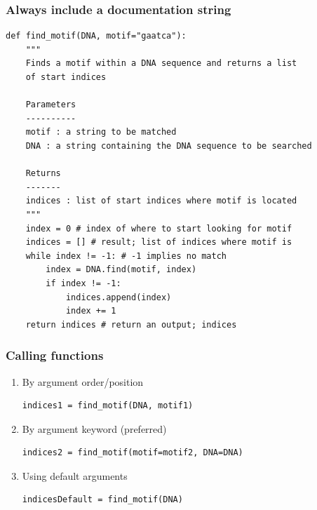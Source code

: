 \documentclass[xcolor=table]{beamer}
\begin{document}
\begin{frame}[fragile]
\frametitle{Always include a documentation string}

\begin{lstlisting}[style=python]
def find_motif(DNA, motif="gaatca"):
    """
    Finds a motif within a DNA sequence and returns a list 
    of start indices
    
    Parameters
    ----------
    motif : a string to be matched 
    DNA : a string containing the DNA sequence to be searched
    
    Returns
    -------
    indices : list of start indices where motif is located
    """
    index = 0 # index of where to start looking for motif
    indices = [] # result; list of indices where motif is
    while index != -1: # -1 implies no match
        index = DNA.find(motif, index)
        if index != -1:
            indices.append(index)
            index += 1
    return indices # return an output; indices
\end{lstlisting}

\end{frame}

\begin{frame}[fragile]
\frametitle{Calling functions}


\begin{enumerate}\addtolength{\itemsep}{-0.4\baselineskip}
\begin{lstlisting}[style=python]
# Example
motif1 = "ggatcc" # sequence to search for
motif2 = "aacctg" # another sequence to search for
DNA = "acgtgtaaccaaggatccacccgttttaaacctgtgtgggatcc"
\end{lstlisting}
\vspace{-0.5cm}
\item<1-> By argument order/position
\begin{lstlisting}[style=python]
indices1 = find_motif(DNA, motif1)
\end{lstlisting}

\item<2-> By argument keyword (preferred)
\begin{lstlisting}[style=python]
indices2 = find_motif(motif=motif2, DNA=DNA)
\end{lstlisting}

\item<3-> Using default arguments
\begin{lstlisting}[style=python]
indicesDefault = find_motif(DNA)
\end{lstlisting}

\end{enumerate}

\end{frame}
\end{document}
